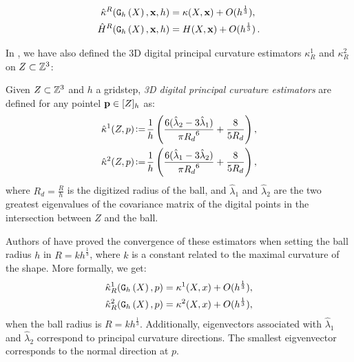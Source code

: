\documentclass{llncs}
\begin{document}
\begin{align}
  \hat{\kappa}^{R}(\mathtt{G}_{h}\left(X\right),\mathbf{x},h) &= \kappa(X,\mathbf{x}) + O(h^{\frac{1}{3}}),\\
  \hat{H}^{R}(\mathtt{G}_{h}\left(X\right),\mathbf{x},h) &= H(X,\mathbf{x}) + O(h^{\frac{1}{3}}) \,.
\end{align}

In \cite{CVIU2014}, we have also defined the 3D digital principal curvature estimators $\kappa^1_{R}$ and $\kappa^2_{R}$
on $Z\subset{\mathbb{Z}}^3$:
\begin{Definition}
  Given $Z \subset {\mathbb{Z}}^3$ and
  $h$ a gridstep, {\em 3D digital principal curvature estimators} are defined for any pointel
  $\mathbf{p} \in \lbrack Z \rbrack_{h}$ as:
  \begin{align}
    \hat{\kappa}^{1}(Z,p) &\!\mathrel{\mathop:}=\! \frac{1}{h} \left( \frac{6(\hat{\lambda}_2 - 3\hat{\lambda}_1)}{\pi {{R_d}}^6} + \frac{8}{5{{R_d}}} \right),\label{eq:dig-curvature-estimator-k1}\\
    \hat{\kappa}^{2}(Z,p) &\!\mathrel{\mathop:}=\! \frac{1}{h} \left( \frac{6(\hat{\lambda}_1 - 3\hat{\lambda}_2)}{\pi {{R_d}}^6} + \frac{8}{5{{R_d}}} \right),
    \label{eq:dig-curvature-estimator-k2}
  \end{align}
  where $R_d = \frac{R}{h}$ is the digitized radius of the ball, and
  $\hat{\lambda}_1$ and $\hat{\lambda}_2$ are the two greatest eigenvalues of the covariance matrix of the digital points in the intersection between $Z$ and the ball.
\end{Definition}

Authors of \cite{CVIU2014} have proved the convergence of these
estimators when setting the ball radius $h$ in $R = kh^\frac{1}{3}$,
where $k$ is a constant related to the maximal curvature of the
shape. More formally, we get:
\begin{align}
  \hat{\kappa}^1_{R}(\mathtt{G}_{h}\left(X\right),p) &= \kappa^1(X,x) + O(h^{\frac{1}{3}}),\\
  \hat{\kappa}^2_{R}(\mathtt{G}_{h}\left(X\right),p) &= \kappa^2(X,x) + O(h^{\frac{1}{3}}),
\end{align}
when the ball radius is $R = kh^\frac{1}{3}$.
Additionally, eigenvectors associated with $\hat{\lambda}_1$ and
$\hat{\lambda}_2$ correspond to principal curvature directions. The
smallest eigvenvector corresponds to the normal direction at $p$.
\end{document}

